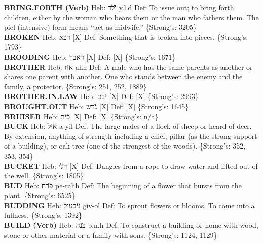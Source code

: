 {\textbf{BRING.FORTH (Verb)} Heb: {\large\H ילד} y.l.d Def: To issue out; to bring forth children, either by the woman who bears them or the man who fathers them. The piel (intensive) form means ``act-as-midwife.'' \{Strong's: 3205\}\hfill{}\\

\textbf{BROKEN} Heb: {\large\H דכא} {[}X{]} Def: Something that is broken into pieces. \{Strong's: 1793\}\hfill{}\\

\textbf{BROODING} Heb: {\large\H דאבון} {[}X{]} Def: {[}X{]} \{Strong's: 1671\}\hfill{}\\

\textbf{BROTHER} Heb: {\large\H אח} ahh Def: A male who has the same parents as another or shares one parent with another. One who stands between the enemy and the family, a protector. \{Strong's: 251, 252, 1889\}\hfill{}\\

\textbf{BROTHER.IN.LAW} Heb: {\large\H יבם} {[}X{]} Def: {[}X{]} \{Strong's: 2993\}\hfill{}\\

\textbf{BROUGHT.OUT} Heb: {\large\H גרש} {[}X{]} Def: {[}X{]} \{Strong's: 1645\}\hfill{}\\

\textbf{BRUISER} Heb: {\large\H כית} {[}X{]} Def: {[}X{]} \{Strong's: n/a\}\hfill{}\\

\textbf{BUCK} Heb: {\large\H איל} a-yil Def: The large males of a flock of sheep or heard of deer. By extension, anything of strength including a chief, pillar (as the strong support of a building), or oak tree (one of the strongest of the woods). \{Strong's: 352, 353, 354\}\hfill{}\\

\textbf{BUCKET} Heb: {\large\H דלי} {[}X{]} Def: Dangles from a rope to draw water and lifted out of the well. \{Strong's: 1805\}\hfill{}\\

\textbf{BUD} Heb: {\large\H פרח} pe-rahh Def: The beginning of a flower that bursts from the plant. \{Strong's: 6525\}\hfill{}\\

\textbf{BUDDING} Heb: {\large\H גיבעול} giv-ol Def: To sprout flowers or blooms. To come into a fullness. \{Strong's: 1392\}\hfill{}\\

\textbf{BUILD (Verb)} Heb: {\large\H בנה} b.n.h Def: To construct a building or home with wood, stone or other material or a family with sons. \{Strong's: 1124, 1129\}\hfill{}\\

}
